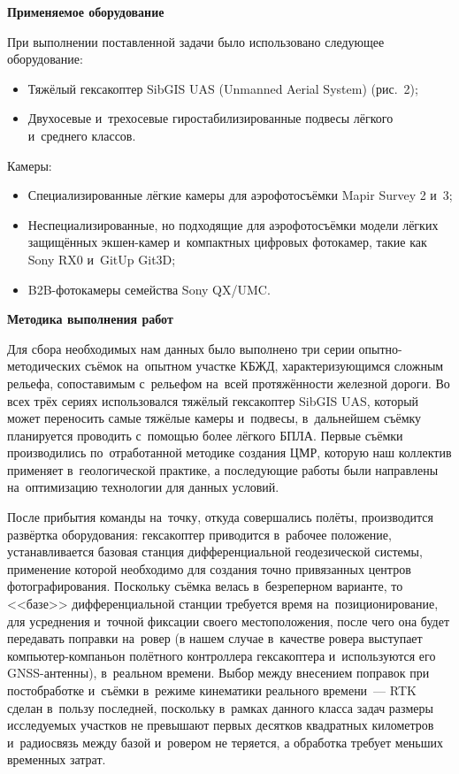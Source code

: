 \textbf{Применяемое оборудование}

При выполнении поставленной задачи было использовано следующее оборудование:

\begin{itemize}[noitemsep]\vspace{-8pt}
\item Тяжёлый гексакоптер SibGIS UAS (Unmanned Aerial System) (рис.~2);
\item Двухосевые и~трехосевые гиростабилизированные подвесы лёгкого и~среднего классов.
\end{itemize}
\vspace{-8pt}



Камеры:

\begin{itemize}[noitemsep]\vspace{-8pt}
\item Специализированные лёгкие камеры для аэрофотосъёмки Mapir Survey 2 и~3;
\item Неспециализированные, но подходящие для аэрофотосъёмки модели лёгких защищённых экшен-камер и~компактных цифровых фотокамер, такие как Sony RX0 и~GitUp Git3D;
\item B2B-фотокамеры семейства Sony QX/UMC.
\end{itemize}
\vspace{-8pt}

\textbf{Методика выполнения работ}

Для сбора необходимых нам данных было выполнено три серии опытно-методических съёмок на~опытном участке КБЖД, характеризующимся сложным рельефа, сопоставимым с~рельефом на~всей протяжённости железной дороги. Во всех трёх сериях использовался тяжёлый гексакоптер SibGIS UAS, который может переносить самые тяжёлые камеры и~подвесы, в~дальнейшем съёмку планируется проводить с~помощью более лёгкого БПЛА. Первые съёмки производились по~отработанной методике создания ЦМР, которую наш коллектив применяет в~геологической практике, а последующие работы были направлены на~оптимизацию технологии для данных условий.

После прибытия команды на~точку, откуда совершались полёты, производится развёртка оборудования: гексакоптер приводится в~рабочее положение, устанавливается базовая станция дифференциальной геодезической системы, применение которой необходимо для создания точно привязанных центров фотографирования. Поскольку съёмка велась в~безреперном варианте, то <<базе>> дифференциальной станции требуется время на~позиционирование, для усреднения и~точной фиксации своего местоположения, после чего она будет передавать поправки на~ровер (в нашем случае в~качестве ровера выступает компьютер-компаньон полётного контроллера гексакоптера и~используются его GNSS-антенны), в~реальном времени. Выбор между внесением поправок при постобработке и~съёмки в~режиме кинематики реального времени~--- RTK сделан в~пользу последней, поскольку в~рамках данного класса задач размеры исследуемых участков не превышают первых десятков квадратных километров и~радиосвязь между базой и~ровером не теряется, а обработка требует меньших временных затрат.

